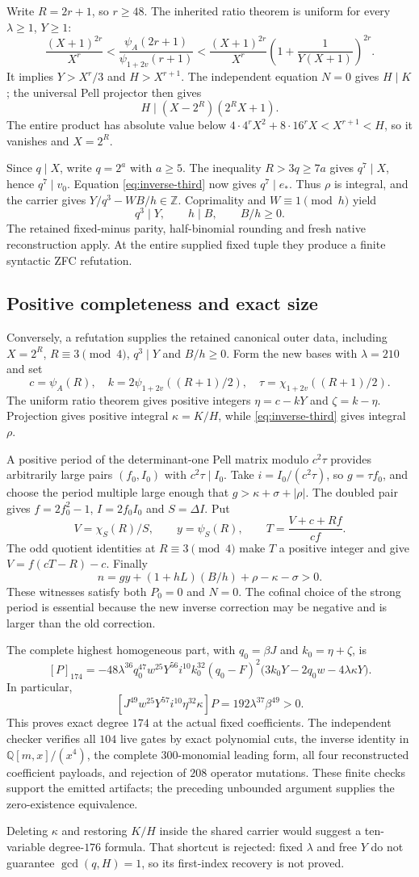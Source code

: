 Write $R=2r+1$, so $r\ge48$. The inherited ratio theorem is uniform for
every $\lambda\ge1$, $Y\ge1$:
\[
 \frac{(X+1)^{2r}}{X^r}
 <\frac{\psi_A(2r+1)}{\psi_{1+2v}(r+1)}
 <\frac{(X+1)^{2r}}{X^r}
      \left(1+\frac1{Y(X+1)}\right)^{2r}.
\]
It implies $Y>X^r/3$ and $H>X^{r+1}$.
The independent equation $N=0$ gives $H\mid K$; the universal Pell
projector then gives
\[
 H\mid (X-2^R)(2^RX+1).
\]
The entire product has absolute value below
$4\cdot4^rX^2+8\cdot16^rX<X^{r+1}<H$, so it vanishes and $X=2^R$.

Since $q\mid X$, write $q=2^a$ with $a\ge5$. The inequality
$R>3q\ge7a$ gives $q^7\mid X$, hence $q^7\mid v_0$.
Equation \eqref{eq:inverse-third} now gives $q^7\mid e_*$.
Thus $\rho$ is integral, and the carrier gives
$Y/q^3-WB/h\in\mathbb Z$. Coprimality and $W\equiv1\pmod h$ yield
\[
 q^3\mid Y,\qquad h\mid B,\qquad B/h\ge0.
\]
The retained fixed-minus parity, half-binomial rounding and fresh native
reconstruction apply. At the entire supplied fixed tuple they produce a
finite syntactic ZFC refutation.

\subsection{Positive completeness and exact size}
Conversely, a refutation supplies the retained canonical outer data,
including $X=2^R$, $R\equiv3\pmod4$, $q^3\mid Y$ and $B/h\ge0$.
Form the new bases with $\lambda=210$ and set
\[
 c=\psi_A(R),\quad k=2\psi_{1+2v}((R+1)/2),\quad
 \tau=\chi_{1+2v}((R+1)/2).
\]
The uniform ratio theorem gives positive integers
$\eta=c-kY$ and $\zeta=k-\eta$. Projection gives positive integral
$\kappa=K/H$, while \eqref{eq:inverse-third} gives integral $\rho$.

A positive period of the determinant-one Pell matrix modulo $c^2\tau$
provides arbitrarily large pairs $(f_0,I_0)$ with $c^2\tau\mid I_0$.
Take $i=I_0/(c^2\tau)$, so $g=\tau f_0$, and choose the period multiple
large enough that $g>\kappa+\sigma+|\rho|$.
The doubled pair gives $f=2f_0^2-1$, $I=2f_0I_0$ and $S=\Delta I$.
Put
\[
 V=\chi_S(R)/S,\qquad y=\psi_S(R),\qquad
 T=\frac{V+c+Rf}{cf}.
\]
The odd quotient identities at $R\equiv3\pmod4$ make $T$ a positive
integer and give $V=f(cT-R)-c$. Finally
\[
 n=gy+(1+hL)(B/h)+\rho-\kappa-\sigma>0.
\]
These witnesses satisfy both $P_0=0$ and $N=0$.
The cofinal choice of the strong period is essential because the new
inverse correction may be negative and is larger than the old correction.

The complete highest homogeneous part, with $q_0=\beta J$ and
$k_0=\eta+\zeta$, is
\[
 [P]_{174}=
 -48\lambda^{36}q_0^{47}w^{25}Y^{56}i^{10}k_0^{32}(q_0-F)^2
 \bigl(3k_0Y-2q_0w-4\lambda\kappa Y\bigr).
\]
In particular,
\[
 [J^{49}w^{25}Y^{57}i^{10}\eta^{32}\kappa]P
 =192\lambda^{37}\beta^{49}>0.
\]
This proves exact degree $174$ at the actual fixed coefficients.
The independent checker verifies all $104$ live gates by exact polynomial
cuts, the inverse identity in $\mathbb Q[m,x]/(x^4)$, the complete
$300$-monomial leading form, all four reconstructed coefficient payloads,
and rejection of $208$ operator mutations. These finite checks support
the emitted artifacts; the preceding unbounded argument supplies the
zero-existence equivalence.

Deleting $\kappa$ and restoring $K/H$ inside the shared carrier would
suggest a ten-variable degree-$176$ formula. That shortcut is rejected:
fixed $\lambda$ and free $Y$ do not guarantee $\gcd(q,H)=1$, so its first-index
recovery is not proved.

